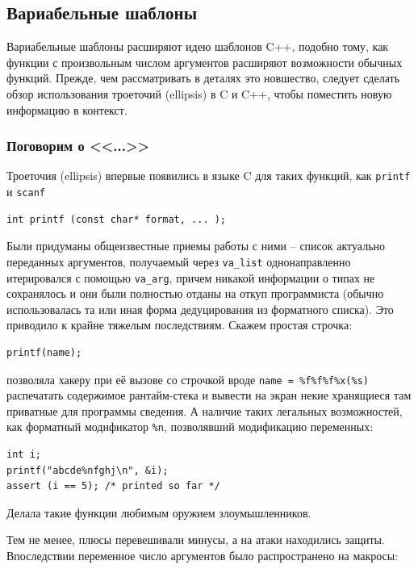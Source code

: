 \documentclass[a4paper,12pt,oneside]{article}
\renewcommand{\texttt}[2][black]{\textcolor{#1}{\ttfamily #2}}
\begin{document}
\pagebreak
\subsection{Вариабельные шаблоны}\label{VariadicTemplates}

Вариабельные шаблоны расширяют идею шаблонов C++, подобно тому, как функции с произвольным числом аргументов расширяют возможности обычных функций. Прежде, чем рассматривать в деталях это новшество, следует сделать обзор использования троеточий (ellipsis) в C и C++, чтобы поместить новую информацию в контекст.

\subsubsection{Поговорим о <<\texttt{...}>>}

Троеточия (ellipsis) впервые появились в языке C для таких функций, как \lstinline!printf! и \lstinline!scanf! 

\begin{lstlisting}
int printf (const char* format, ... );
\end{lstlisting}

Были придуманы общеизвестные приемы работы с ними -- список актуально переданных аргументов, получаемый через \lstinline!va_list! однонаправленно итерировался с помощью \lstinline!va_arg!, причем никакой информации о типах не сохранялось и они были полностью отданы на откуп программиста (обычно использовалась та или иная форма дедуцирования из форматного списка). Это приводило к крайне тяжелым последствиям. Скажем простая строчка:

\begin{lstlisting}
printf(name);
\end{lstlisting}

позволяла хакеру при её вызове со строчкой вроде \lstinline!name = %f%f%f%x(%s)! распечатать содержимое рантайм-стека и вывести на экран некие хранящиеся там приватные для программы сведения. А наличие таких легальных возможностей, как форматный модификатор \lstinline!%n!, позволявший модификацию переменных:

\begin{lstlisting}
int i;
printf("abcde%nfghj\n", &i);
assert (i == 5); /* printed so far */
\end{lstlisting}

Делала такие функции любимым оружием злоумышленников. 

Тем не менее, плюсы перевешивали минусы, а на атаки находились защиты. Впоследствии переменное число аргументов было распространено на макросы:
\end{document}
